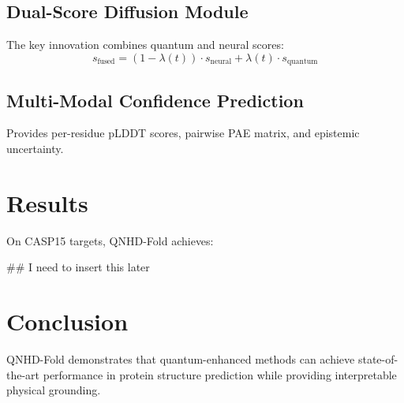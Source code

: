 \documentclass[11pt,twocolumn]{article}
\begin{document}
\subsection{Dual-Score Diffusion Module}
The key innovation combines quantum and neural scores:
\begin{equation}
s_{\text{fused}} = (1 - \lambda(t)) \cdot s_{\text{neural}} + \lambda(t) \cdot s_{\text{quantum}}
\end{equation}

\subsection{Multi-Modal Confidence Prediction}
Provides per-residue pLDDT scores, pairwise PAE matrix, and epistemic uncertainty.

\section{Results}

On CASP15 targets, QNHD-Fold achieves:
\begin{itemize}
## I need to insert this later
\end{itemize}

\section{Conclusion}

QNHD-Fold demonstrates that quantum-enhanced methods can achieve state-of-the-art performance in protein structure prediction while providing interpretable physical grounding.
\end{document}

